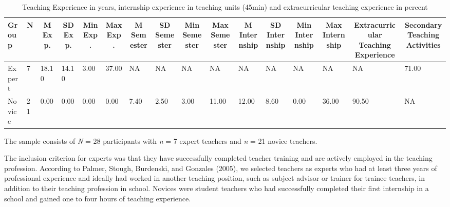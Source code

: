 \documentclass[
  man,floatsintext]{apa6}
\begin{document}
\begin{table}[h]

\begin{center}
\begin{threeparttable}

\caption{\label{tab:demographicstable}Teaching Experience in years, internship experience in teaching units (45min) and extracurricular teaching experience in percent}

\tiny{

\begin{tabular}{llllllllllllllll}
\toprule
Group & \multicolumn{1}{c}{N} & \multicolumn{1}{c}{M Exp.} & \multicolumn{1}{c}{SD Exp.} & \multicolumn{1}{c}{Min Exp.} & \multicolumn{1}{c}{Max Exp.} & \multicolumn{1}{c}{M Semester} & \multicolumn{1}{c}{SD Semester} & \multicolumn{1}{c}{Min Semester} & \multicolumn{1}{c}{Max Semester} & \multicolumn{1}{c}{M Internship} & \multicolumn{1}{c}{SD Internship} & \multicolumn{1}{c}{Min Internship} & \multicolumn{1}{c}{Max Internship} & \multicolumn{1}{c}{Extracurricular Teaching Experience} & \multicolumn{1}{c}{Secondary Teaching Activities}\\
\midrule
Expert & 7 & 18.10 & 14.10 & 3.00 & 37.00 & NA & NA & NA & NA & NA & NA & NA & NA & NA & 71.00\\
Novice & 21 & 0.00 & 0.00 & 0.00 & 0.00 & 7.40 & 2.50 & 3.00 & 11.00 & 12.00 & 8.60 & 0.00 & 36.00 & 90.50 & NA\\
\bottomrule
\end{tabular}

}

\end{threeparttable}
\end{center}

\end{table}

The sample consists of \emph{N} = 28 participants with \emph{n} = 7 expert teachers and \emph{n} = 21 novice teachers.

The inclusion criterion for experts was that they have successfully completed teacher training and are actively employed in the teaching profession. According to Palmer, Stough, Burdenski, and Gonzales (2005), we selected teachers as experts who had at least three years of professional experience and ideally had worked in another teaching position, such as subject advisor or trainer for trainee teachers, in addition to their teaching profession in school. Novices were student teachers who had successfully completed their first internship in a school and gained one to four hours of teaching experience.
\end{document}
